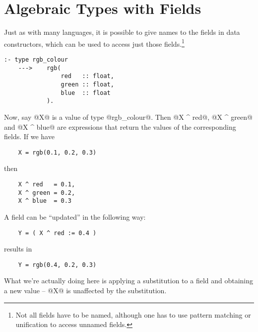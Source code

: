 \section{Algebraic Types with Fields}
Just as with many languages, it is possible to give names to
the fields in data constructors, which can be used to access
just those fields.\footnote{Not all fields have to be named, although one has
to use pattern matching or unification to access unnamed
fields.}
\begin{verbatim}
:- type rgb_colour
    --->    rgb(
                red   :: float,
                green :: float,
                blue  :: float
            ).
\end{verbatim}
Now, say @X@ is a value of type @rgb_colour@.  Then @X ^ red@,
@X ^ green@ and @X ^ blue@ are expressions that return the values
of the corresponding fields.  If we have
\begin{verbatim}
    X = rgb(0.1, 0.2, 0.3)
\end{verbatim}
then
\begin{verbatim}
    X ^ red   = 0.1,
    X ^ green = 0.2,
    X ^ blue  = 0.3
\end{verbatim}
A field can be ``updated'' in the following way:
\begin{verbatim}
    Y = ( X ^ red := 0.4 )
\end{verbatim}
results in
\begin{verbatim}
    Y = rgb(0.4, 0.2, 0.3)
\end{verbatim}
What we're actually doing here is applying a substitution to
a field and obtaining a new value -- @X@ is unaffected by the
substitution.

